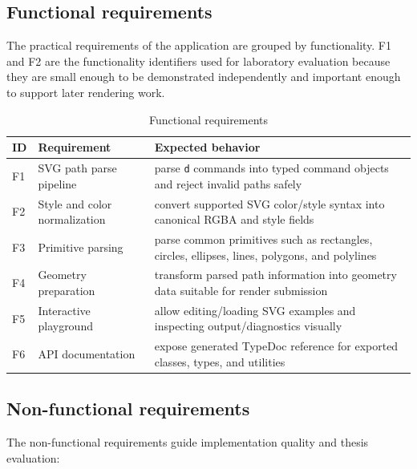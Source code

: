\subsection{Functional requirements}

The practical requirements of the application are grouped by functionality.
F1 and F2 are the functionality identifiers used for laboratory evaluation because they are small enough to be demonstrated independently and important enough to support later rendering work.

\begin{table}[htbp]
\centering
\caption{Functional requirements}
\label{tab:functional_requirements}
\begin{tabular}{>{\raggedright\arraybackslash}p{1.6cm} >{\raggedright\arraybackslash}p{5.1cm} >{\raggedright\arraybackslash}p{5.7cm}}
\toprule
\textbf{ID} & \textbf{Requirement} & \textbf{Expected behavior} \\
\midrule
F1 & SVG path parse pipeline & parse \texttt{d} commands into typed command objects and reject invalid paths safely \\
F2 & Style and color normalization & convert supported SVG color/style syntax into canonical RGBA and style fields \\
F3 & Primitive parsing & parse common primitives such as rectangles, circles, ellipses, lines, polygons, and polylines \\
F4 & Geometry preparation & transform parsed path information into geometry data suitable for render submission \\
F5 & Interactive playground & allow editing/loading SVG examples and inspecting output/diagnostics visually \\
F6 & API documentation & expose generated TypeDoc reference for exported classes, types, and utilities \\
\bottomrule
\end{tabular}
\end{table}

\subsection{Non-functional requirements}

The non-functional requirements guide implementation quality and thesis evaluation:

